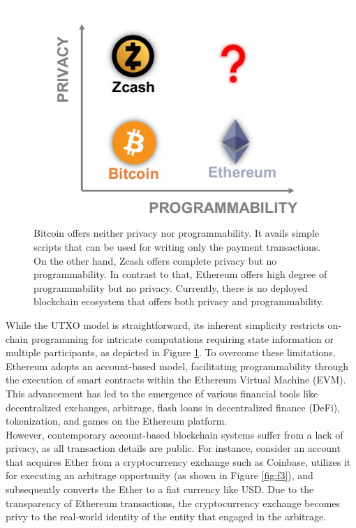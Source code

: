 \documentclass{report}
\begin{document}
\begin{center}
	\begin{figure}
		\centering
		\includegraphics[width=0.8\linewidth]{Fig/F2}
		\caption{Bitcoin offers neither privacy nor programmability. It avails simple scripts that can be used for writing only the payment transactions. On the other hand, Zcash offers complete privacy but no programmability. In contrast to that, Ethereum offers high degree of programmability but no privacy. Currently, there is no deployed blockchain ecosystem that offers both privacy and programmability.
		}
		\label{fig:f2}
	\end{figure}
\end{center}
While the UTXO model is straightforward, its inherent simplicity restricts on-chain programming for intricate computations requiring state information or multiple participants, as depicted in Figure \ref{fig:f2}. To overcome these limitations, Ethereum adopts an account-based model, facilitating programmability through the execution of smart contracts within the Ethereum Virtual Machine (EVM). This advancement has led to the emergence of various financial tools like decentralized exchanges, arbitrage, flash loans in decentralized finance (DeFi), tokenization, and games on the Ethereum platform.\\
However, contemporary account-based blockchain systems suffer from a lack of privacy, as all transaction details are public. For instance, consider an account that acquires Ether from a cryptocurrency exchange such as Coinbase, utilizes it for executing an arbitrage opportunity (as shown in Figure \ref{fig:f3}), and subsequently converts the Ether to a fiat currency like USD. Due to the transparency of Ethereum transactions, the cryptocurrency exchange becomes privy to the real-world identity of the entity that engaged in the arbitrage.\\
\end{document}
